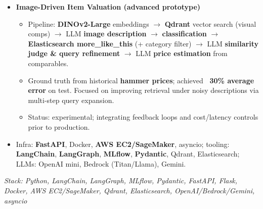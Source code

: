 \documentclass[10pt,a4paper]{altacv}
\begin{document}
\begin{itemize}
\begin{itemize}
  \end{itemize}
  \item \textbf{Image-Driven Item Valuation (advanced prototype)}
  \begin{itemize}
    \item Pipeline: \textbf{DINOv2-Large} embeddings $\rightarrow$ \textbf{Qdrant} vector search (visual comps) $\rightarrow$ LLM \textbf{image description} $\rightarrow$ \textbf{classification} $\rightarrow$ \textbf{Elasticsearch more\_like\_this} (+ category filter) $\rightarrow$ LLM \textbf{similarity judge \& query refinement} $\rightarrow$ LLM \textbf{price estimation} from comparables.
    \item Ground truth from historical \textbf{hammer prices}; achieved \textbf{~30\% average error} on test. Focused on improving retrieval under noisy descriptions via multi-step query expansion.
    \item Status: experimental; integrating feedback loops and cost/latency controls prior to production.
  \end{itemize}
  \item Infra: \textbf{FastAPI}, Docker, \textbf{AWS EC2/SageMaker}, asyncio; tooling: \textbf{LangChain}, \textbf{LangGraph}, \textbf{MLflow}, \textbf{Pydantic}, Qdrant, Elasticsearch; LLMs: OpenAI mini, Bedrock (Titan/Llama), Gemini.
\end{itemize}
\textit{Stack: Python, LangChain, LangGraph, MLflow, Pydantic, FastAPI, Flask, Docker, AWS EC2/SageMaker, Qdrant, Elasticsearch, OpenAI/Bedrock/Gemini, asyncio}

\divider
\end{document}
